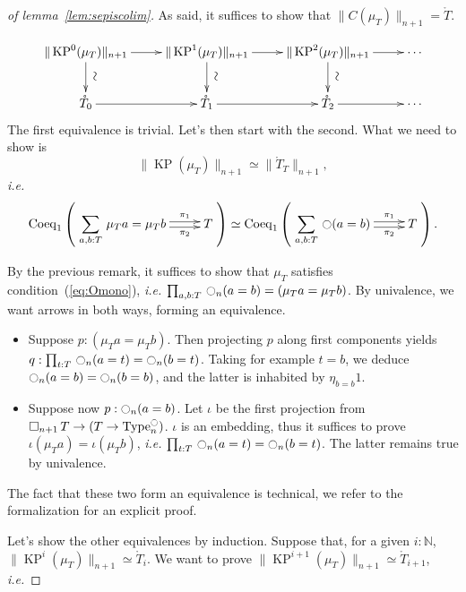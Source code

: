 \documentclass[notfinal]{jfrarticle}
\DeclareMathOperator{\Type}{Type}
\newcommand{\modal}{\ensuremath{\ocircle}}
\newcommand \separated {\mathop{\square_{n+1}} }
\newcommand{\sumD}[3]{\sum_{#1:#2}\, #3}
\newcommand{\prodD}[3]{\prod_{#1:#2}\, #3}
\DeclareMathOperator{\KP}{KP}
\newcommand{\N}{\mathbb{N}} %
\newcommand{\ie}{\emph{i.e.}}
\begin{document}
\begin{proof}[of lemma~\ref{lem:sepiscolim}]
  As said, it suffices to show that $\|C(\mu_T)\|_{n+1} =
  \mathring T$.

  \[
    \xymatrix{%
     \|\KP^0(\mu_T)\|_{n+1} \ar[r] \ar[d]^*[@]{\hbox to 0pt{\hss$\sim$\hss}}&
     \|\KP^1(\mu_T)\|_{n+1} \ar[r] \ar[d]^*[@]{\hbox to
       0pt{\hss$\sim$\hss}} & 
     \|\KP^2(\mu_T)\|_{n+1} \ar[r] \ar[d]^*[@]{\hbox to
       0pt{\hss$\sim$\hss}} & \cdots \\
     \mathring T_0 \ar[r] & \mathring T_1 \ar[r] &  \mathring T_2
     \ar[r] &\cdots
    }
  \]
  The first equivalence is trivial. Let's then start with the
  second. What we need to show is
  \[ \|\KP(\mu_T)\|_{n+1} \simeq \|\mathring T_T\|_{n+1}, \]
  \ie{}
  \[
    \mathrm{Coeq}_1 \left( 
      \xymatrix{
        \displaystyle{\sumD {a,b} T {\mu_T a = \mu_T b}} \ar@<-.5ex>[r]_-{\pi_2} \ar@<.5ex>[r]^-{\pi_1} & T
      }
    \right)
    \simeq \mathrm{Coeq}_1 \left( 
      \xymatrix{\displaystyle{\sumD {a,b} T{\modal (a=b)}} \ar@<-.5ex>[r]_-{\pi_2} \ar@<.5ex>[r]^-{\pi_1} & T}
    \right).
  \]
  
  By the previous remark, it suffices to show that $\mu_T$ satisfies condition~(\ref{eq:Omono}),
  \ie{} $\prodD {a,b} T {\modal_n (a=b) = (\mu_T a =
  \mu_T b)}$. By univalence, we want arrows in both ways, forming an
  equivalence.
  \begin{itemize}
  \item Suppose $p : (\mu_T a = \mu_T b)$. Then projecting $p$ along
    first components yields $q : \prodD t T {\modal_n(a=t)} = \modal_n (b=t)
    $.
    Taking for example $t=b$, we deduce $\modal_n (a=b) = \modal_n(b=b)$,
    and the latter is inhabited by $\eta_{b=b} 1$.
  \item Suppose now $p : \modal_n(a=b)$. Let $\iota$ be the first
    projection from $\separated T \to (T \to \Type_n^\modal)$. $\iota$ is
    an embedding, thus it suffices to prove $\iota (\mu_T a) = \iota
    (\mu_T b)$, \ie{} $\prodD t T{\modal_n (a=t) = \modal_n (b=t)}$. The latter
    remains true by univalence.
  \end{itemize}
  The fact that these two form an equivalence is technical, we refer to
  the formalization for an explicit proof.


  Let's show the other equivalences by induction. Suppose that, for a
  given $i:\N$, $\|\KP^i(\mu_T)\|_{n+1} \simeq \mathring T_i$. We want
  to prove $\|\KP^{i+1}(\mu_T)\|_{n+1} \simeq \mathring T_{i+1}$, \ie{}


\end{proof}
\end{document}
